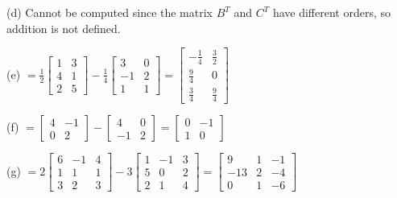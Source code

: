 \documentclass[addpoints]{exam}
\begin{document}
\begin{questions}
\begin{solution}
        (d) Cannot be computed since the matrix $ B^T $ and $ C^T $ have different orders, so addition is not defined.

        (e) $ = \frac{1}{2}\begin{bmatrix}
            1 & 3 \\ 4 & 1 \\ 2 & 5
        \end{bmatrix} -\frac{1}{4}\begin{bmatrix}
            3 & 0 \\ -1 & 2 \\ 1 & 1
        \end{bmatrix} = \begin{bmatrix}
            -\frac{1}{4} & \frac{3}{2} \\ 
            \frac{9}{4} & 0 \\ \frac{3}{4} & \frac{9}{4}
        \end{bmatrix}$

        (f) $ = \begin{bmatrix}
            4 & -1 \\ 0 & 2
        \end{bmatrix} - \begin{bmatrix}
            4 & 0 \\ -1 & 2
        \end{bmatrix} = \begin{bmatrix}
            0 & -1 \\ 1 & 0
        \end{bmatrix}$

        (g) $ = 2\begin{bmatrix}
            6 & -1 & 4 \\ 1 & 1 & 1 \\ 3 & 2 & 3
        \end{bmatrix} - 3\begin{bmatrix}
            1 & -1 & 3 \\ 5 & 0 & 2 \\ 2 & 1 & 4
        \end{bmatrix} = \begin{bmatrix}
            9 & 1 & -1 \\ 
            -13 & 2 & -4 \\ 
            0 & 1 & -6
        \end{bmatrix}$


\end{solution}
\end{questions}
\end{document}
